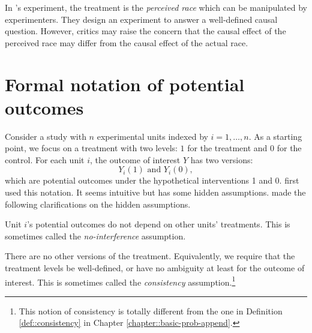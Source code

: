 In \citet{bertrand2004emily}'s experiment, the treatment is the {\it perceived race} which can be manipulated by experimenters. They design an experiment to answer a well-defined causal question.  However, critics may raise the concern that the causal effect of the perceived race may differ from the causal effect of the actual race. 



\section{Formal notation of potential outcomes}
\label{sec::po-sciencetable}

Consider a study with $n$ experimental units indexed by $i= 1, \ldots, n$. As a starting point, we focus on a treatment with two levels: $1$ for the treatment and $0$ for the control. For each unit $i$, the outcome of interest $Y$ has two versions: 
$$
Y_i(1)  \text{ and } Y_i(0),
$$ 
which are potential outcomes under the hypothetical interventions 1 and 0. 
\citet{Neyman:1923} first used this notation. It seems intuitive but has some hidden assumptions. \citet{Rubin:1980} made the following clarifications on the hidden assumptions.

\begin{assumption}
[no interference]
\label{sutva1}
Unit $i$'s potential outcomes do not depend on other units' treatments. This is sometimes called the {\it no-interference} assumption. 
\end{assumption}


\begin{assumption}
[consistency]
\label{sutva2}
There are no other versions of the treatment. Equivalently, we require that the treatment levels be well-defined, or have no ambiguity at least for the outcome of interest. This is sometimes called the {\it consistency} assumption.\footnote{This notion of consistency is totally different from the one in Definition \ref{def::consistency} in Chapter \ref{chapter::basic-prob-append}.} 
\end{assumption}


%
%

